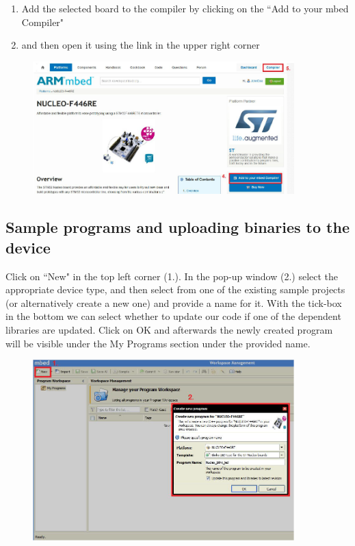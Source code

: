 \documentclass[a4paper]{article}
\begin{document}
\begin{enumerate}[resume]
    \item Add the selected board to the compiler by clicking on the ``Add to your mbed Compiler"
    \item and then open it using the  link in the upper right corner
\end{enumerate}
\begin{figure}[H]
    \centering
    \includegraphics[width=0.9\textwidth]{figures/mbed-compiler.png}
\end{figure}

\subsection{Sample programs and uploading binaries to the device}

Click on ``New" in the top left corner (1.). In the pop-up window (2.) select the appropriate device type, and then
select from one of the existing sample projects (or alternatively create a new one) and provide a name for it. With
the tick-box in the bottom we can select whether to update our code if one of the dependent libraries are updated.
Click on OK and afterwards the newly created program will be visible under the My Programs section under the  provided
name.
\begin{figure}[H]
    \centering
    \includegraphics[width=0.9\textwidth]{figures/mbed-new.png}
\end{figure}
\end{document}
